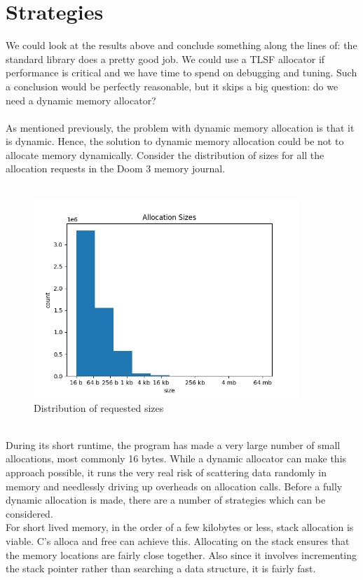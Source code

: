 \documentclass{article}
\begin{document}
\section{Strategies}
We could look at the results above and conclude something along the lines of: the standard library does a pretty good job. We could use a TLSF allocator if performance is critical and we have time to spend on debugging and tuning. Such a conclusion would be perfectly reasonable, but it skips a big question: do we need a dynamic memory allocator?\\
\\
As mentioned previously, the problem with dynamic memory allocation is that it is dynamic. Hence, the solution to dynamic memory allocation could be not to allocate memory dynamically. Consider the distribution of sizes for all the allocation requests in the Doom 3 memory journal.\\
\\
\begin{figure}[htbp]
	\centering
	\includegraphics[width=10cm]{size_distribution}
	\captionsetup{width=10cm}
	\caption{Distribution of requested sizes}
\end{figure}
\\
During its short runtime, the program has made a very large number of small allocations, most commonly 16 bytes. While a dynamic allocator can make this approach possible, it runs the very real risk of scattering data randomly in memory and needlessly driving up overheads on allocation calls. Before a fully dynamic allocation is made, there are a number of strategies which can be considered.\\
For short lived memory, in the order of a few kilobytes or less, stack allocation is viable. C's alloca and free can achieve this. Allocating on the stack ensures that the memory locations are fairly close together. Also since it involves incrementing the stack pointer rather than searching a data structure, it is fairly fast.\\
\end{document}
